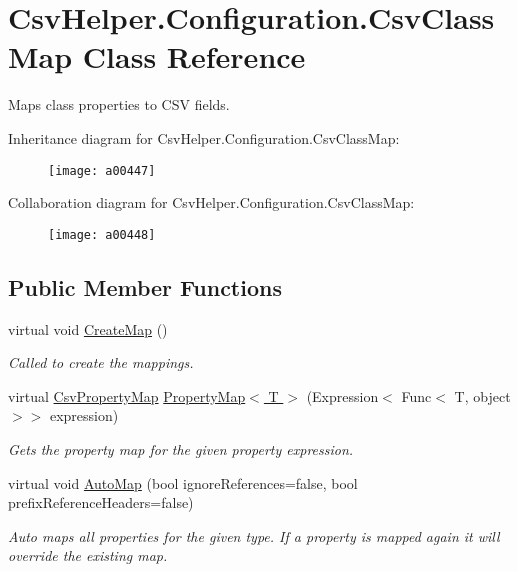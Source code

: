 \hypertarget{a00057}{\section{Csv\-Helper.\-Configuration.\-Csv\-Class\-Map Class Reference}
\label{a00057}
}


Maps class properties to C\-S\-V fields.  




Inheritance diagram for Csv\-Helper.\-Configuration.\-Csv\-Class\-Map\-:
\nopagebreak
\begin{figure}[H]
\begin{center}
\leavevmode
\texttt{[image: a00447]}
\end{center}
\end{figure}


Collaboration diagram for Csv\-Helper.\-Configuration.\-Csv\-Class\-Map\-:
\nopagebreak
\begin{figure}[H]
\begin{center}
\leavevmode
\texttt{[image: a00448]}
\end{center}
\end{figure}
\subsection*{Public Member Functions}
\begin{DoxyCompactItemize}
\item 
virtual void \hyperlink{a00057_a83de9d28160d0d3da1e017df554a9481}{Create\-Map} ()
\begin{DoxyCompactList}\small\item\em Called to create the mappings. \end{DoxyCompactList}\item 
virtual \hyperlink{a00067}{Csv\-Property\-Map} \hyperlink{a00057_abab2b5cd5a290fd5d17116430b084420}{Property\-Map$<$ T $>$} (Expression$<$ Func$<$ T, object $>$$>$ expression)
\begin{DoxyCompactList}\small\item\em Gets the property map for the given property expression. \end{DoxyCompactList}\item 
virtual void \hyperlink{a00057_aec2097b09baaaac45171f91592af439d}{Auto\-Map} (bool ignore\-References=false, bool prefix\-Reference\-Headers=false)
\begin{DoxyCompactList}\small\item\em Auto maps all properties for the given type. If a property is mapped again it will override the existing map. \end{DoxyCompactList}\end{DoxyCompactItemize}
